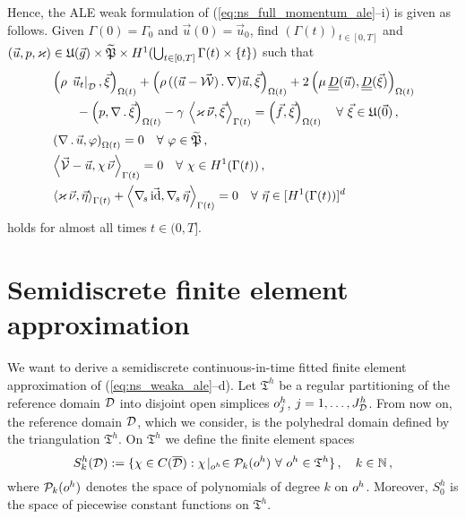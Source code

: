 Hence, the ALE weak formulation of (\ref{eq:ns_full_momentum_ale}--i)
is given as follows. Given $\Gamma(0) = \Gamma_0$ and
$\vec u(0) = \vec u_0$,
find $(\Gamma(t))_{t\in[0,T]}$ and
$(\vec u, p, \varkappa)\in \mathfrak{U}(\vec{g}) \times \widetilde{\mathfrak{P}} \times
H^1(\bigcup_{t\in[0,T]} \Gamma(t) \times \{t\})$
such that
\begin{subequations}
\begin{align}
& \left(\rho\,\left.\vec u_t\right|_{\D}, \vec \xi\right)_{\Omega(t)} +
\left(\rho\,((\vec u - \W)\,.\, \nabla )\vec u,\vec \xi\right)_{\Omega(t)}
+ 2\left(\mu\,\mat D(\vec u), \mat D(\vec \xi)\right)_{\Omega(t)} \nonumber \\
& \qquad - \left(p, \nabla\,.\,\vec \xi\right)_{\Omega(t)}
- \gamma\,\left\langle \varkappa\,\vec\nu, \vec\xi\right\rangle_{\Gamma(t)}
= \left(\vec f, \vec \xi\right)_{\Omega(t)}\quad \forall\ \vec\xi \in
\uspaceale 0 \,, \label{eq:ns_weaka_ale}\\
& \left(\nabla\,.\,\vec u, \varphi\right)_{\Omega(t)} = 0
\quad \forall\ \varphi \in \pnormspaceale\,, \label{eq:ns_weakb_ale} \\
&  \left\langle \V
- \vec u, \chi\,\vec\nu \right\rangle_{\Gamma(t)} = 0
\quad \forall\ \chi \in H^1(\Gamma(t))\,, \label{eq:ns_weakc_ale} \\
& \left\langle \varkappa\,\vec\nu, \vec\eta \right\rangle_{\Gamma(t)}
+ \left\langle \nabs\,\vec \id, \nabs\,\vec \eta \right\rangle_{\Gamma(t)}
= 0  \quad \forall\ \vec\eta \in [H^1(\Gamma(t))]^d\,\label{eq:ns_weakd_ale}
\end{align}
\end{subequations}
holds for almost all times $t \in (0,T]$.

\section{Semidiscrete finite element approximation}\label{sec:ale_semi_fem}
We want to derive a semidiscrete continuous-in-time fitted finite element
approximation of (\ref{eq:ns_weaka_ale}--d). Let ${\mathfrak T}^h$ be a regular
partitioning of the reference domain $\mathcal D$ into disjoint open simplices
$o^h_j$, $j = 1 ,\ldots, J^h_\mathcal D$. From now on, the reference domain $\mathcal D$,
which we consider, is the polyhedral domain defined by the triangulation
${\mathfrak T}^h$. On ${\mathfrak T}^h$ we define the finite element spaces
\begin{equation*}
S^h_k(\mathcal D) := \{\chi \in C(\overline{\mathcal D}) : \chi\!\mid_{o^h}
\in \mathcal{P}_k(o^h) \ \forall\ o^h \in {\mathfrak T}^h\}\,,
\quad k \in \mathbb{N}\,,
\end{equation*}
where $\mathcal{P}_k(o^h)$ denotes the space of polynomials of degree $k$
on $o^h$. Moreover, $S^h_0$ is the space of piecewise constant
functions on ${\mathfrak T}^h$.

